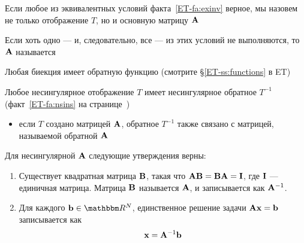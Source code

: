 \begin{frame}

    \vspace{2em}
    Если любое из эквивалентных условий
    факта~\ref{ET-fa:exinv} верное, мы назовем  не только 
    отображение $T$, но и основную матрицу $\mathbf A$ 
    
    \vspace{.7em}
    Если хоть одно --- и, следовательно, все --- из этих условий не выполняются, то $\mathbf A$ называется 
    
\end{frame}

\begin{frame}
    
    \vspace{2em}
    Любая биекция имеет обратную функцию (смотрите \S\ref{ET-ss:functions} в ET)
    
    \vspace{.7em}
    Любое несингулярное отображение $T$ имеет несингулярное обратное $T^{-1}$ 
    (факт~\ref{ET-fa:nsins} на странице~\pageref{ET-fa:nsins})
    
    \begin{itemize}
        \item если $T$ создано матрицей $\mathbf A$, обратное $T^{-1}$ также связано 
        с матрицей, называемой обратной $\mathbf A$ 
    \end{itemize}

\end{frame}

\begin{frame}

    \vspace{2em}    
    \Thm{\eqref{ET-t:nonsigmat}}
        Для несингулярной $\mathbf A$ следующие утверждения верны:
        \begin{enumerate}
            \item Существует квадратная матрица $\mathbf B$, такая что $\mathbf A
                \mathbf B = \mathbf B \mathbf A = \mathbf I$, где $\mathbf I$ ---
                единичная матрица. Матрица $\mathbf B$ называется 
                $\mathbf A$, и записывается как $\mathbf A^{-1}$.
            \item Для каждого $\boldb \in \RR^N$, единственное
            решение задачи $\mathbf A {\mathbf x} =
                {\mathbf b}$ записывается как 
                    \begin{equation*}
                        \label{eq:sofox}
                        {\mathbf x} = \mathbf A^{-1} {\mathbf b}
                    \end{equation*}
        \end{enumerate}

\end{frame}

